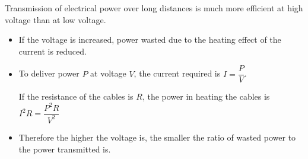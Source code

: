 Transmission of electrical power over long distances is much more efficient at high voltage than at low voltage.
\begin{itemize}
    \item If the voltage is increased, power wasted due to the heating effect of the current is reduced.
    \item To deliver power $P$ at voltage $V$, the current required is $I=\dfrac{P}{V}$.

        If the resistance of the cables is $R$, the power in heating the cables is $I^2R=\dfrac{P^2R}{V^2}$
    \item Therefore the higher the voltage is, the smaller the ratio of wasted power to the power transmitted is.
\end{itemize}
